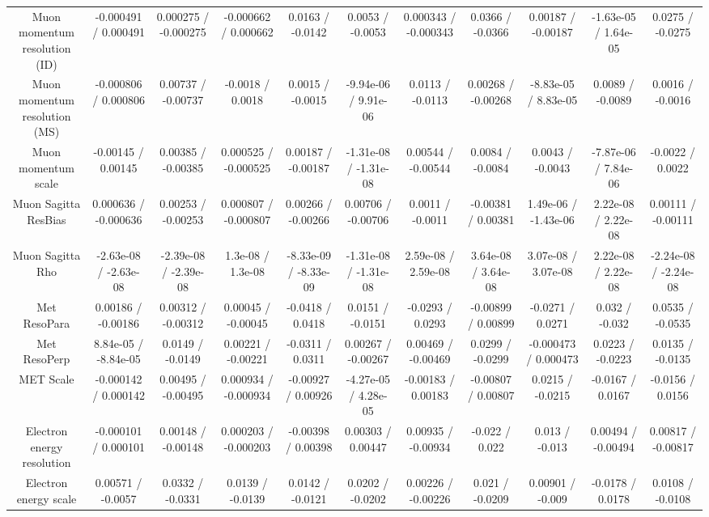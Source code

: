 \begin{table}[htbp]
\begin{center}
\begin{tabular}{|c|c|c|c|c|c|c|c|c|c|c|}
  Muon momentum resolution (ID) & -0.000491 / 0.000491 & 0.000275 / -0.000275 & -0.000662 / 0.000662 & 0.0163 / -0.0142 & 0.0053 / -0.0053 & 0.000343 / -0.000343 & 0.0366 / -0.0366 & 0.00187 / -0.00187 & -1.63e-05 / 1.64e-05 & 0.0275 / -0.0275 \\ 
  Muon momentum resolution (MS) & -0.000806 / 0.000806 & 0.00737 / -0.00737 & -0.0018 / 0.0018 & 0.0015 / -0.0015 & -9.94e-06 / 9.91e-06 & 0.0113 / -0.0113 & 0.00268 / -0.00268 & -8.83e-05 / 8.83e-05 & 0.0089 / -0.0089 & 0.0016 / -0.0016 \\ 
  Muon momentum scale & -0.00145 / 0.00145 & 0.00385 / -0.00385 & 0.000525 / -0.000525 & 0.00187 / -0.00187 & -1.31e-08 / -1.31e-08 & 0.00544 / -0.00544 & 0.0084 / -0.0084 & 0.0043 / -0.0043 & -7.87e-06 / 7.84e-06 & -0.0022 / 0.0022 \\ 
  Muon Sagitta ResBias & 0.000636 / -0.000636 & 0.00253 / -0.00253 & 0.000807 / -0.000807 & 0.00266 / -0.00266 & 0.00706 / -0.00706 & 0.0011 / -0.0011 & -0.00381 / 0.00381 & 1.49e-06 / -1.43e-06 & 2.22e-08 / 2.22e-08 & 0.00111 / -0.00111 \\ 
  Muon Sagitta Rho & -2.63e-08 / -2.63e-08 & -2.39e-08 / -2.39e-08 & 1.3e-08 / 1.3e-08 & -8.33e-09 / -8.33e-09 & -1.31e-08 / -1.31e-08 & 2.59e-08 / 2.59e-08 & 3.64e-08 / 3.64e-08 & 3.07e-08 / 3.07e-08 & 2.22e-08 / 2.22e-08 & -2.24e-08 / -2.24e-08 \\ 
  Met ResoPara & 0.00186 / -0.00186 & 0.00312 / -0.00312 & 0.00045 / -0.00045 & -0.0418 / 0.0418 & 0.0151 / -0.0151 & -0.0293 / 0.0293 & -0.00899 / 0.00899 & -0.0271 / 0.0271 & 0.032 / -0.032 & 0.0535 / -0.0535 \\ 
  Met ResoPerp & 8.84e-05 / -8.84e-05 & 0.0149 / -0.0149 & 0.00221 / -0.00221 & -0.0311 / 0.0311 & 0.00267 / -0.00267 & 0.00469 / -0.00469 & 0.0299 / -0.0299 & -0.000473 / 0.000473 & 0.0223 / -0.0223 & 0.0135 / -0.0135 \\ 
  MET Scale & -0.000142 / 0.000142 & 0.00495 / -0.00495 & 0.000934 / -0.000934 & -0.00927 / 0.00926 & -4.27e-05 / 4.28e-05 & -0.00183 / 0.00183 & -0.00807 / 0.00807 & 0.0215 / -0.0215 & -0.0167 / 0.0167 & -0.0156 / 0.0156 \\ 
  Electron energy resolution & -0.000101 / 0.000101 & 0.00148 / -0.00148 & 0.000203 / -0.000203 & -0.00398 / 0.00398 & 0.00303 / 0.00447 & 0.00935 / -0.00934 & -0.022 / 0.022 & 0.013 / -0.013 & 0.00494 / -0.00494 & 0.00817 / -0.00817 \\ 
  Electron energy scale & 0.00571 / -0.0057 & 0.0332 / -0.0331 & 0.0139 / -0.0139 & 0.0142 / -0.0121 & 0.0202 / -0.0202 & 0.00226 / -0.00226 & 0.021 / -0.0209 & 0.00901 / -0.009 & -0.0178 / 0.0178 & 0.0108 / -0.0108 \\ 

\end{tabular}
\end{center}
\end{table}
